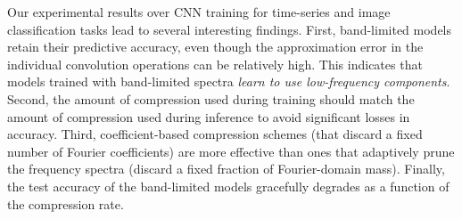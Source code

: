  Our experimental results over CNN training for time-series and image classification tasks lead to several interesting findings. First, band-limited models retain their predictive accuracy, even though the approximation error in the individual convolution operations can be relatively high. This indicates that models trained with band-limited spectra \emph{learn to use low-frequency components}. Second, the amount of compression used during training should match the amount of compression used during inference to avoid significant losses in accuracy. Third, coefficient-based compression schemes (that discard a fixed number of Fourier coefficients) are more effective than ones that adaptively prune the frequency spectra (discard a fixed fraction of Fourier-domain mass). Finally, the test accuracy of the band-limited models gracefully degrades as a function of the compression rate.
 

